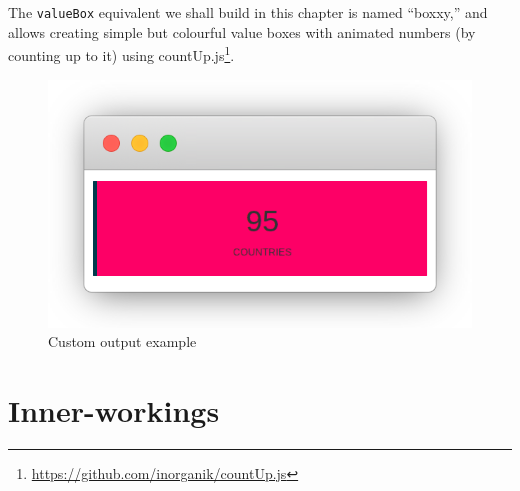 \documentclass[
]{krantz}
\makeatletter
\newenvironment{Shaded}{\begin{snugshade}}{\end{snugshade}}
\newcommand{\ControlFlowTok}[1]{\textcolor[rgb]{0.27,0.27,0.27}{\textbf{#1}}}
\newcommand{\DecValTok}[1]{\textcolor[rgb]{0.06,0.06,0.06}{#1}}
\newcommand{\KeywordTok}[1]{\textcolor[rgb]{0.27,0.27,0.27}{\textbf{#1}}}
\newcommand{\NormalTok}[1]{#1}
\newcommand{\OperatorTok}[1]{\textcolor[rgb]{0.43,0.43,0.43}{\textbf{#1}}}
\newcommand{\StringTok}[1]{\textcolor[rgb]{0.5,0.5,0.5}{#1}}
\renewcommand{\href}[2]{#2\footnote{\url{#1}}}
\newenvironment{kframe}{%
\medskip{}
\setlength{\fboxsep}{.8em}
 \def\at@end@of@kframe{}%
 \ifinner\ifhmode%
  \def\at@end@of@kframe{\end{minipage}}%
  \begin{minipage}{\columnwidth}%
 \fi\fi%
 \def\FrameCommand##1{\hskip\@totalleftmargin \hskip-\fboxsep
 \colorbox{shadecolor}{##1}\hskip-\fboxsep
     \hskip-\linewidth \hskip-\@totalleftmargin \hskip\columnwidth}%
 \MakeFramed {\advance\hsize-\width
   \@totalleftmargin\z@ \linewidth\hsize
   \@setminipage}}%
 {\par\unskip\endMakeFramed%
 \at@end@of@kframe}
\renewenvironment{Shaded}{\begin{kframe}}{\end{kframe}}
\makeatother
\begin{document}
The \texttt{valueBox} equivalent we shall build in this chapter is named ``boxxy,'' and allows creating simple but colourful value boxes with animated numbers (by counting up to it) using \href{https://github.com/inorganik/countUp.js}{countUp.js}.

\begin{Shaded}
\end{Shaded}

\begin{figure}[t]

{\centering \includegraphics[width=1\linewidth]{images/boxxy-example} 

}

\caption{Custom output example}\label{fig:boxxy-example}
\end{figure}

\hypertarget{shiny-output-inner-workings}{%
\section{Inner-workings}\label{shiny-output-inner-workings}}
\end{document}
